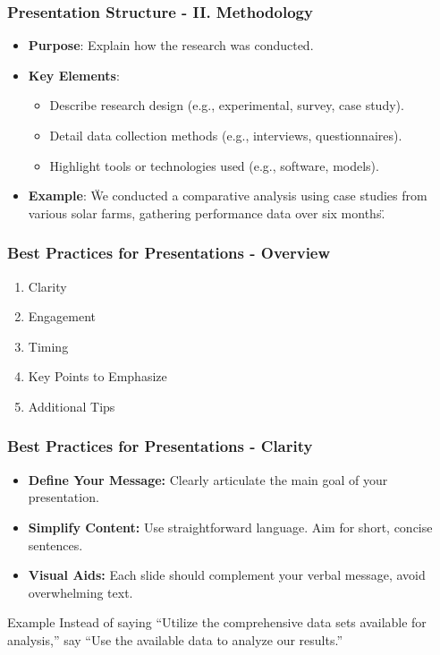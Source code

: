 \documentclass[aspectratio=169]{beamer}
\begin{document}
\begin{frame}[fragile]
    \frametitle{Presentation Structure - II. Methodology}
    \begin{itemize}
        \item \textbf{Purpose}: Explain how the research was conducted.
        \item \textbf{Key Elements}:
            \begin{itemize}
                \item Describe research design (e.g., experimental, survey, case study).
                \item Detail data collection methods (e.g., interviews, questionnaires).
                \item Highlight tools or technologies used (e.g., software, models).
            \end{itemize}
        \item \textbf{Example}: 
            \"We conducted a comparative analysis using case studies from various solar farms, gathering performance data over six months.\"
    \end{itemize}
\end{frame}

\begin{frame}[fragile]
    \frametitle{Best Practices for Presentations - Overview}
    \begin{enumerate}
        \item Clarity
        \item Engagement
        \item Timing
        \item Key Points to Emphasize
        \item Additional Tips
    \end{enumerate}
\end{frame}

\begin{frame}[fragile]
    \frametitle{Best Practices for Presentations - Clarity}
    \begin{itemize}
        \item \textbf{Define Your Message:} Clearly articulate the main goal of your presentation. 
        \item \textbf{Simplify Content:} Use straightforward language. Aim for short, concise sentences.
        \item \textbf{Visual Aids:} Each slide should complement your verbal message, avoid overwhelming text.
    \end{itemize}
    \begin{block}{Example}
        Instead of saying “Utilize the comprehensive data sets available for analysis,” say “Use the available data to analyze our results.”
    \end{block}
\end{frame}
\end{document}
